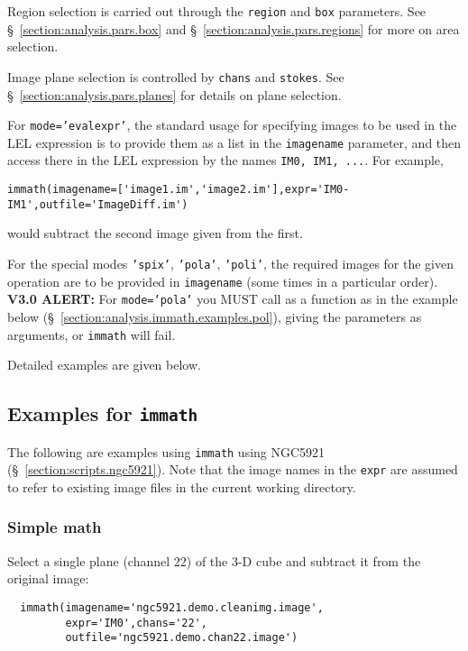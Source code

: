 Region selection is carried out through the {\tt region} and {\tt box}
parameters.
See \S~\ref{section:analysis.pars.box} and
\S~\ref{section:analysis.pars.regions} for more on area
selection.

Image plane selection is controlled by {\tt chans} and {\tt stokes}.
See \S~\ref{section:analysis.pars.planes} for details on plane
selection.

For {\tt mode='evalexpr'}, the standard usage for specifying images to
be used in the LEL expression is to provide them as a list in the {\tt imagename}
parameter, and then access there in the LEL expression by the
names {\tt IM0, IM1, ...}.  For example,
\small
\begin{verbatim}
immath(imagename=['image1.im','image2.im'],expr='IM0-IM1',outfile='ImageDiff.im')
\end{verbatim}
\normalsize
would subtract the second image given from the first.

For the special modes {\tt 'spix'}, {\tt 'pola'}, {\tt 'poli'}, the
required images for the given operation are to be provided in 
{\tt imagename} (some times in a particular order). 
{\bf V3.0 ALERT:} For {\tt mode='pola'} you MUST call as a function as
in the example below (\S~\ref{section:analysis.immath.examples.pol}), 
giving the parameters as arguments, or {\tt immath} will fail.

Detailed examples are given below.

\subsection{Examples for {\tt immath}}
\label{section:analysis.immath.examples}

The following are examples using {\tt immath} using NGC5921 
(\S~\ref{section:scripts.ngc5921}).  Note that the image
names in the {\tt expr} are assumed to refer to existing image files
in the current working directory.

\subsubsection{Simple math}
\label{section:analysis.immath.examples.math}

Select a single plane (channel 22) of the 3-D cube and  
subtract it from the original image: 
\small
\begin{verbatim}
  immath(imagename='ngc5921.demo.cleanimg.image',
         expr='IM0',chans='22',
         outfile='ngc5921.demo.chan22.image')
\end{verbatim}
\normalsize

